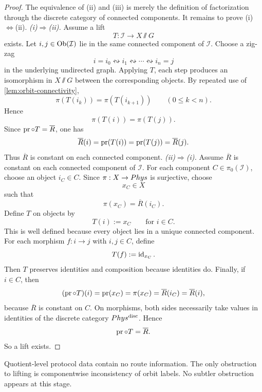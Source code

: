 \begin{proof}
	The equivalence of \textup{(ii)} and \textup{(iii)} is merely the
	definition of factorization through the discrete category of connected
	components.
	It remains to prove
	\textup{(i)}\(\Leftrightarrow\)\textup{(ii)}.
	\smallskip
	\noindent
	\emph{\textup{(i)}\(\Rightarrow\)\textup{(ii)}.}
	Assume a lift
	\[
		T:\mathcal I\to X\sslash G
	\]
	exists.
	Let \(i,j\in\operatorname{Ob}(\mathcal I)\) lie in the same connected component of
	\(\mathcal I\).
	Choose a zig-zag
	\[
		i=i_0 \leftrightsquigarrow i_1 \leftrightsquigarrow \cdots
		\leftrightsquigarrow i_n=j
	\]
	in the underlying undirected graph.
	Applying \(T\), each step produces an isomorphism in \(X\sslash G\)
	between the corresponding objects.
	By repeated use of \cref{lem:orbit-connectivity},
	\[
		\pi(T(i_k))=\pi(T(i_{k+1}))
		\qquad
		(0\le k<n).
	\]
	Hence
	\[
		\pi(T(i))=\pi(T(j)).
	\]
	Since \(\operatorname{pr}\circ T=\overline R\), one has
	\[
		\overline R(i)=\operatorname{pr}(T(i))=\operatorname{pr}(T(j))=\overline R(j).
	\]
	Thus \(\overline R\) is constant on each connected component.
	\smallskip
	\noindent
	\emph{\textup{(ii)}\(\Rightarrow\)\textup{(i)}.}
	Assume \(\overline R\) is constant on each connected component of
	\(\mathcal I\).
	For each component \(C\in\pi_0(\mathcal I)\), choose an object
	\(i_C\in C\).
	Since \(\pi:X\to Phys\) is surjective, choose
	\[
		x_C\in X
	\]
	such that
	\[
		\pi(x_C)=\overline R(i_C).
	\]
	Define \(T\) on objects by
	\[
		T(i):=x_C
		\qquad
		\text{for } i\in C.
	\]
	This is well defined because every object lies in a unique connected
	component.
	For each morphism \(f:i\to j\) with \(i,j\in C\), define
	\[
		T(f):=\operatorname{id}_{x_C}.
	\]
	Then \(T\) preserves identities and composition because identities do.
	Finally, if \(i\in C\), then
	\[
		(\operatorname{pr}\circ T)(i)=\operatorname{pr}(x_C)=\pi(x_C)=\overline R(i_C)=\overline R(i),
	\]
	because \(\overline R\) is constant on \(C\).
	On morphisms, both sides necessarily take values in identities of the
	discrete category \(Phys^{\mathrm{disc}}\).
	Hence
	\[
		\operatorname{pr}\circ T=\overline R.
	\]
	So a lift exists.
\end{proof}
\begin{remark}
	Quotient-level protocol data contain no route information.
	The only obstruction to lifting is componentwise inconsistency of orbit
	labels.
	No subtler obstruction appears at this stage.
\end{remark}
